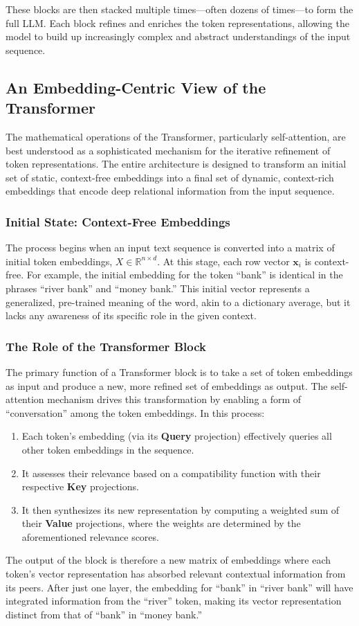 \documentclass[%
  reprint,
  superscriptaddress,
  showpacs,
  showkeys,
  amsmath,amssymb,
  pra,
  longbibliography,
  floatfix,
  x11names
]{revtex4-2}
\begin{document}
These blocks are then stacked multiple times---often dozens of times---to form the full LLM. Each block refines and enriches the token representations, allowing the model to build up increasingly complex and abstract understandings of the input sequence.

\subsection{An Embedding-Centric View of the Transformer}
\label{app:embedding_centric}

The mathematical operations of the Transformer, particularly self-attention, are best understood as a sophisticated mechanism for the iterative refinement of token representations. The entire architecture is designed to transform an initial set of static, context-free embeddings into a final set of dynamic, context-rich embeddings that encode deep relational information from the input sequence.

\subsubsection{Initial State: Context-Free Embeddings}
The process begins when an input text sequence is converted into a matrix of initial token embeddings, $X \in \mathbb{R}^{n \times d}$. At this stage, each row vector $\bm{x}_i$ is context-free. For example, the initial embedding for the token ``bank'' is identical in the phrases ``river bank'' and ``money bank.'' This initial vector represents a generalized, pre-trained meaning of the word, akin to a dictionary average, but it lacks any awareness of its specific role in the given context.

\subsubsection{The Role of the Transformer Block}
The primary function of a Transformer block is to take a set of token embeddings as input and produce a new, more refined set of embeddings as output. The self-attention mechanism drives this transformation by enabling a form of ``conversation'' among the token embeddings. In this process:
\begin{enumerate}
    \item Each token's embedding (via its \textbf{Query} projection) effectively queries all other token embeddings in the sequence.
    \item It assesses their relevance based on a compatibility function with their respective \textbf{Key} projections.
    \item It then synthesizes its new representation by computing a weighted sum of their \textbf{Value} projections, where the weights are determined by the aforementioned relevance scores.
\end{enumerate}
The output of the block is therefore a new matrix of embeddings where each token's vector representation has absorbed relevant contextual information from its peers. After just one layer, the embedding for ``bank'' in ``river bank'' will have integrated information from the ``river'' token, making its vector representation distinct from that of ``bank'' in ``money bank.''
\end{document}
